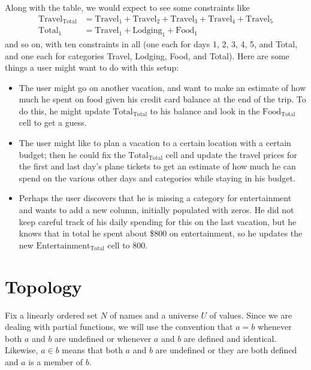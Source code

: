 \documentclass{article}
\begin{document}
Along with the table, we would expect to see some constraints like
\begin{align*}
    \mathrm{Travel}_\mathrm{Total} &=
    \mathrm{Travel}_1+\mathrm{Travel}_2+\mathrm{Travel}_3+\mathrm{Travel}_4+\mathrm{Travel}_5
    \\
    \mathrm{Total}_1 &= \mathrm{Travel_1}+\mathrm{Lodging}_1+\mathrm{Food}_1
\end{align*}
and so on, with ten constraints in all (one each for days 1, 2, 3, 4, 5, and
Total, and one each for categories Travel, Lodging, Food, and Total). Here
are some things a user might want to do with this setup:
\begin{itemize}
    \item The user might go on another vacation, and want to make an
        estimate of how much he spent on food given his credit card balance
        at the end of the trip. To do this, he might update
        $\mathrm{Total}_\mathrm{Total}$ to his balance and look in the
        $\mathrm{Food}_\mathrm{Total}$ cell to get a guess.
    \item The user might like to plan a vacation to a certain
        location with a certain budget; then he could fix the
        $\mathrm{Total}_\mathrm{Total}$ cell and update the travel prices
        for the first and last day's plane tickets to get an estimate of how
        much he can spend on the various other days and categories while
        staying in his budget.
    \item Perhaps the user discovers that he is missing a category for
        entertainment and wants to add a new column, initially populated
        with zeros. He did not keep careful track of his daily spending for
        this on the last vacation, but he knows that in total he spent about
        \$800 on entertainment, so he updates the new
        $\mathrm{Entertainment}_\mathrm{Total}$ cell to 800.
\end{itemize}

\section{Topology}
Fix a linearly ordered set $N$ of names and a universe $U$ of values. Since
we are dealing with partial functions, we will use the convention that
$a = b$ whenever both $a$ and $b$ are undefined or whenever $a$ and $b$ are
defined and identical. Likewise, $a \in b$ means that both $a$ and $b$ are
undefined or they are both defined and $a$ is a member of $b$.
\end{document}

